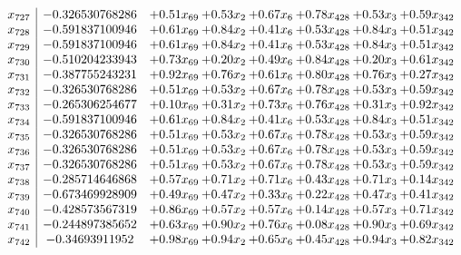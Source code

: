 \documentclass[8pt]{article}
\begin{document}
\[\begin{array}{c| c c@{\hskip 2pt} c@{\hskip 2pt} c@{\hskip 2pt} c@{\hskip 2pt} c@{\hskip 2pt} c@{\hskip 2pt} }
 x_{727}   &  -0.326530768286 & +  0.51 x_{69} & +  0.53 x_{2} & +  0.67 x_{6} & +  0.78 x_{428} & +  0.53 x_{3} & +  0.59 x_{342}\\
 x_{728}   &  -0.591837100946 & +  0.61 x_{69} & +  0.84 x_{2} & +  0.41 x_{6} & +  0.53 x_{428} & +  0.84 x_{3} & +  0.51 x_{342}\\
 x_{729}   &  -0.591837100946 & +  0.61 x_{69} & +  0.84 x_{2} & +  0.41 x_{6} & +  0.53 x_{428} & +  0.84 x_{3} & +  0.51 x_{342}\\
 x_{730}   &  -0.510204233943 & +  0.73 x_{69} & +  0.20 x_{2} & +  0.49 x_{6} & +  0.84 x_{428} & +  0.20 x_{3} & +  0.61 x_{342}\\
 x_{731}   &  -0.387755243231 & +  0.92 x_{69} & +  0.76 x_{2} & +  0.61 x_{6} & +  0.80 x_{428} & +  0.76 x_{3} & +  0.27 x_{342}\\
 x_{732}   &  -0.326530768286 & +  0.51 x_{69} & +  0.53 x_{2} & +  0.67 x_{6} & +  0.78 x_{428} & +  0.53 x_{3} & +  0.59 x_{342}\\
 x_{733}   &  -0.265306254677 & +  0.10 x_{69} & +  0.31 x_{2} & +  0.73 x_{6} & +  0.76 x_{428} & +  0.31 x_{3} & +  0.92 x_{342}\\
 x_{734}   &  -0.591837100946 & +  0.61 x_{69} & +  0.84 x_{2} & +  0.41 x_{6} & +  0.53 x_{428} & +  0.84 x_{3} & +  0.51 x_{342}\\
 x_{735}   &  -0.326530768286 & +  0.51 x_{69} & +  0.53 x_{2} & +  0.67 x_{6} & +  0.78 x_{428} & +  0.53 x_{3} & +  0.59 x_{342}\\
 x_{736}   &  -0.326530768286 & +  0.51 x_{69} & +  0.53 x_{2} & +  0.67 x_{6} & +  0.78 x_{428} & +  0.53 x_{3} & +  0.59 x_{342}\\
 x_{737}   &  -0.326530768286 & +  0.51 x_{69} & +  0.53 x_{2} & +  0.67 x_{6} & +  0.78 x_{428} & +  0.53 x_{3} & +  0.59 x_{342}\\
 x_{738}   &  -0.285714646868 & +  0.57 x_{69} & +  0.71 x_{2} & +  0.71 x_{6} & +  0.43 x_{428} & +  0.71 x_{3} & +  0.14 x_{342}\\
 x_{739}   &  -0.673469928909 & +  0.49 x_{69} & +  0.47 x_{2} & +  0.33 x_{6} & +  0.22 x_{428} & +  0.47 x_{3} & +  0.41 x_{342}\\
 x_{740}   &  -0.428573567319 & +  0.86 x_{69} & +  0.57 x_{2} & +  0.57 x_{6} & +  0.14 x_{428} & +  0.57 x_{3} & +  0.71 x_{342}\\
 x_{741}   &  -0.244897385652 & +  0.63 x_{69} & +  0.90 x_{2} & +  0.76 x_{6} & +  0.08 x_{428} & +  0.90 x_{3} & +  0.69 x_{342}\\
 x_{742}   &  -0.34693911952 & +  0.98 x_{69} & +  0.94 x_{2} & +  0.65 x_{6} & +  0.45 x_{428} & +  0.94 x_{3} & +  0.82 x_{342}\\

\end{array}\]
\end{document}
